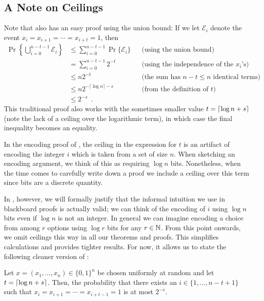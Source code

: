 \documentclass{patmorin}
\newenvironment{customthm}[1]
  {\renewcommand\theinnercustomthm{#1}\innercustomthm}
  {\endinnercustomthm}
\begin{document}
\subsection{A Note on Ceilings}

Note that  also has an easy proof using the union
bound: If we let $\mathcal{E}_i$ denote the event
$x_i=x_{i+1}=\cdots=x_{i+t}=1$, then
\begin{align*}
  \Pr \left\{\bigcup_{i=0}^{n-t-1} \mathcal{E}_i\right\}
  & \le \sum_{i=0}^{n-t-1} \Pr \{\mathcal{E}_i\} && \text{(using the union bound)}\\
  & = \sum_{i=0}^{n-t-1} 2^{-t}  &&\text{(using the independence of the $x_i$'s)}\\
  & \le n2^{-t} && \text{(the sum has $n-t\le n$ identical terms)}\\
  & \le n2^{-\lceil\log n\rceil-s}&& \text{(from the definition of $t$)}\\
  & \le 2^{-s} \enspace .
\end{align*}
This traditional proof also works with the sometimes smaller value
$t={\lceil \log n+s \rceil}$ (note the lack of a ceiling over the logarithmic
term), in which case the final inequality becomes an equality.

In the encoding proof of , the ceiling in the
expression for $t$ is an artifact of encoding the integer $i$ which is
taken from a set of size $n$. When sketching an encoding argument, we
think of this as requiring $\log n$ bits. Nonetheless, when 
 the time comes to carefully write down a
proof we include a ceiling over this term since bits are a discrete
quantity.

In , however, we will 
formally justify that the informal
intuition we use in blackboard proofs is actually valid; we can think
of the encoding of $i$ using $\log n$ bits even if $\log n$ is not an
integer.  In general we can imagine encoding a choice from among $r$
options using $\log r$ bits for any $r\in\mathbb{N}$.  From this point
onwards, we omit ceilings this way in all our theorems and
proofs. This simplifies calculations and provides tighter results.
For now, it allows us to state the following cleaner version of
:

\begin{customthm}{\ref*{thm:runs-i}b}
  Let $x=(x_1,\ldots,x_n)\in\{0,1\}^n$ be chosen uniformly at random
  and let $t = {\lceil \log n + s \rceil}$. Then, the probability that there
  exists an $i\in\{1,\ldots,n-t+1\}$ such that
  $x_i=x_{i+1}=\cdots=x_{i+t-1}=1$ is at most $2^{-s}$.
\end{customthm}
\end{document}
